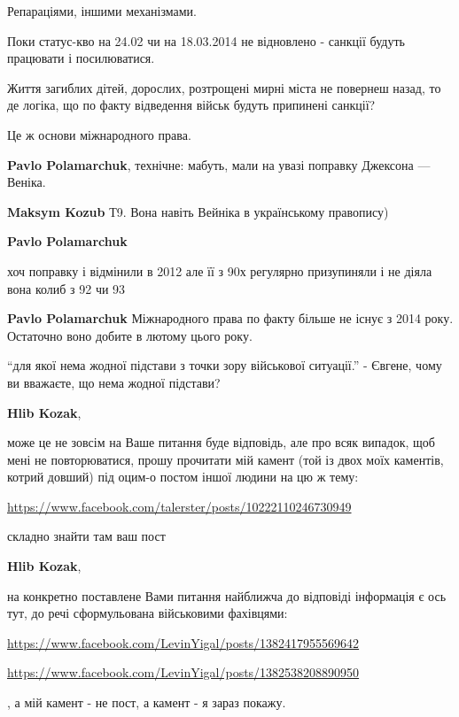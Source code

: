 \begin{itemize}
\begin{itemize}
Репараціями, іншими механізмами.

Поки статус-кво на 24.02 чи на 18.03.2014 не відновлено - санкції будуть
працювати і посилюватися.

Життя загиблих дітей, дорослих, розтрощені мирні міста не повернеш назад, то де
логіка, що по факту відведення військ будуть припинені санкції?

Це ж основи міжнародного права.

\textbf{Pavlo Polamarchuk}, технічне: мабуть, мали на увазі поправку Джексона — Веніка.

\textbf{Maksym Kozub} Т9.
Вона навіть Вейніка в українському правопису)

\textbf{Pavlo Polamarchuk}

хоч поправку і відмінили в 2012 але її з 90х регулярно призупиняли і не діяла
вона колиб з 92 чи 93

\textbf{Pavlo Polamarchuk} Міжнародного права по факту більше не існує з 2014 року. Остаточно воно добите в лютому цього року.

\end{itemize} %


\enquote{для якої нема жодної підстави з точки зору військової ситуації.} -
Євгене, чому ви вважаєте, що нема жодної підстави?

\begin{itemize} %
\textbf{Hlib Kozak}, 

може це не зовсім на Ваше питання буде відповідь, але про всяк випадок, щоб
мені не повторюватися, прошу прочитати мій камент (той із двох моїх каментів,
котрий довший) під оцим-о постом іншої людини на цю ж тему:

\url{https://www.facebook.com/talerster/posts/10222110246730949}

складно знайти там ваш пост

\textbf{Hlib Kozak}, 

на конкретно поставлене Вами питання найближча до відповіді інформація є ось
тут, до речі сформульована військовими фахівцями:

\url{https://www.facebook.com/LevinYigal/posts/1382417955569642}

\url{https://www.facebook.com/LevinYigal/posts/1382538208890950}

, а мій камент - не пост, а камент - я зараз покажу.


\end{itemize}
\end{itemize}
